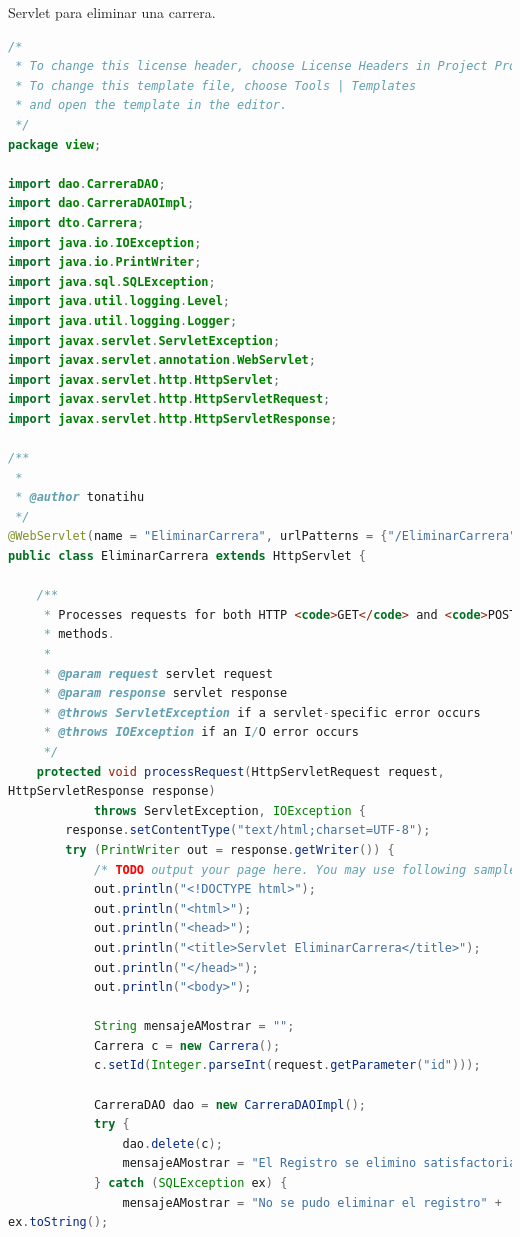 \documentclass[a4paper,12pt]{article}
\begin{document}
Servlet para eliminar una carrera.

\begin{lstlisting}[language=Java, style=customJava, 
caption={EliminarCarrera.java}, captionpos=b, 
basicstyle=\fontfamily{cmss}\small]
/*
 * To change this license header, choose License Headers in Project Properties.
 * To change this template file, choose Tools | Templates
 * and open the template in the editor.
 */
package view;

import dao.CarreraDAO;
import dao.CarreraDAOImpl;
import dto.Carrera;
import java.io.IOException;
import java.io.PrintWriter;
import java.sql.SQLException;
import java.util.logging.Level;
import java.util.logging.Logger;
import javax.servlet.ServletException;
import javax.servlet.annotation.WebServlet;
import javax.servlet.http.HttpServlet;
import javax.servlet.http.HttpServletRequest;
import javax.servlet.http.HttpServletResponse;

/**
 *
 * @author tonatihu
 */
@WebServlet(name = "EliminarCarrera", urlPatterns = {"/EliminarCarrera"})
public class EliminarCarrera extends HttpServlet {

    /**
     * Processes requests for both HTTP <code>GET</code> and <code>POST</code>
     * methods.
     *
     * @param request servlet request
     * @param response servlet response
     * @throws ServletException if a servlet-specific error occurs
     * @throws IOException if an I/O error occurs
     */
    protected void processRequest(HttpServletRequest request, 
HttpServletResponse response)
            throws ServletException, IOException {
        response.setContentType("text/html;charset=UTF-8");
        try (PrintWriter out = response.getWriter()) {
            /* TODO output your page here. You may use following sample code. */
            out.println("<!DOCTYPE html>");
            out.println("<html>");
            out.println("<head>");
            out.println("<title>Servlet EliminarCarrera</title>");
            out.println("</head>");
            out.println("<body>");

            String mensajeAMostrar = "";
            Carrera c = new Carrera();
            c.setId(Integer.parseInt(request.getParameter("id")));

            CarreraDAO dao = new CarreraDAOImpl();
            try {
                dao.delete(c);
                mensajeAMostrar = "El Registro se elimino satisfactoriamente";
            } catch (SQLException ex) {
                mensajeAMostrar = "No se pudo eliminar el registro" + 
ex.toString();
                

\end{lstlisting}
\end{document}
